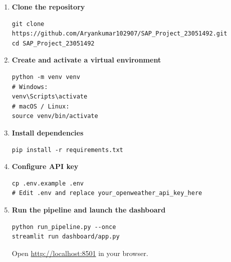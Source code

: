\documentclass[12pt,a4paper]{report}
\begin{document}
\begin{enumerate}[leftmargin=*, label=\textbf{Step \arabic*.}]
  \item \textbf{Clone the repository}
    \begin{lstlisting}[style=bashstyle]
git clone https://github.com/Aryankumar102907/SAP_Project_23051492.git
cd SAP_Project_23051492
    \end{lstlisting}

  \item \textbf{Create and activate a virtual environment}
    \begin{lstlisting}[style=bashstyle]
python -m venv venv
# Windows:
venv\Scripts\activate
# macOS / Linux:
source venv/bin/activate
    \end{lstlisting}

  \item \textbf{Install dependencies}
    \begin{lstlisting}[style=bashstyle]
pip install -r requirements.txt
    \end{lstlisting}

  \item \textbf{Configure API key}
    \begin{lstlisting}[style=bashstyle]
cp .env.example .env
# Edit .env and replace your_openweather_api_key_here
    \end{lstlisting}

  \item \textbf{Run the pipeline and launch the dashboard}
    \begin{lstlisting}[style=bashstyle]
python run_pipeline.py --once
streamlit run dashboard/app.py
    \end{lstlisting}
    Open \url{http://localhost:8501} in your browser.
\end{enumerate}
\end{document}
